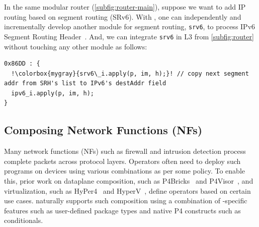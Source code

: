 \documentclass[letterpaper,twocolumn,10pt]{article}
\begin{document}
%
In the same modular router (\cref{subfig:router-main}), suppose we 
want to add IP routing based on segment routing (SRv6). With \ulang, 
one can independently and incrementally develop another module for 
segment routing, \texttt{srv6}, to process IPv6 Segment Routing
Header~\cite{srh}. And, we can integrate \texttt{srv6} in 
L3 from \cref{subfig:router} without touching any other module as 
follows:
\begin{lstlisting}[frame=none, escapechar=!]
0x86DD : {
  !\colorbox{mygray}{srv6\_i.apply(p, im, h);}! // copy next segment addr from SRH's list to IPv6's destAddr field
  ipv6_i.apply(p, im, h);
}
\end{lstlisting}




\subsection{Composing Network Functions (NFs)}
\label{subsection:composing-dataplane-programs-of-NFs}
Many network functions (NFs) such as firewall and intrusion detection
process complete packets across protocol layers. Operators often need
to deploy such programs on devices using various combinations as per
some policy. To enable this, prior work on dataplane composition, such
as P4Bricks~\cite{soni:hal-01632431} and
P4Visor~\cite{Zheng:2018:PLV:3281411.3281436}, and virtualization,
such as HyPer4~\cite{Hancock:2016:HUP:2999572.2999607} and
HyperV~\cite{8038396}, define operators based on certain use cases.
\ulang naturally supports such composition using a combination of
\ulang-specific features such as user-defined package types and native
P4 constructs such as conditionals.
\end{document}
